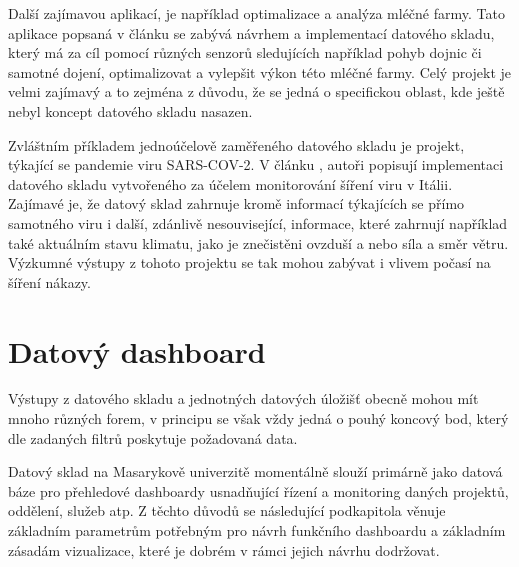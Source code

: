 \documentclass[
  digital,     %
  twoside,     %
  lof,         %
  lot,         %
]{fithesis4}
\begin{document}
Další zajímavou aplikací, je například optimalizace a analýza mléčné farmy. Tato aplikace popsaná v článku  \parencite{Schuetz20180326} se zabývá návrhem a implementací datového skladu, který má za cíl pomocí různých senzorů sledujících například pohyb dojnic či samotné dojení, optimalizovat a vylepšit výkon této mléčné farmy. Celý projekt je velmi zajímavý a to zejména z důvodu, že se jedná o specifickou oblast, kde ještě nebyl koncept datového skladu nasazen.

Zvláštním příkladem jednoúčelově zaměřeného datového skladu je projekt, týkající se pandemie viru SARS-COV-2. V článku  \parencite{Agapito2020}, autoři popisují implementaci datového skladu vytvořeného za účelem monitorování šíření viru v Itálii. Zajímavé je, že datový sklad zahrnuje kromě informací týkajících se přímo samotného viru i další, zdánlivě nesouvisející, informace, které zahrnují například také aktuálním stavu klimatu, jako je znečistěni ovzduší a nebo síla a směr větru. Výzkumné výstupy z tohoto projektu se tak mohou zabývat i vlivem počasí na šíření nákazy. 

\section{Datový dashboard}
Výstupy z datového skladu a jednotných datových úložišť obecně mohou mít mnoho různých forem, v principu se však vždy jedná o pouhý koncový bod, který dle zadaných filtrů poskytuje požadovaná data.

Datový sklad na Masarykově univerzitě momentálně slouží primárně jako datová báze pro přehledové dashboardy usnadňující řízení a monitoring daných projektů, oddělení, služeb atp. Z těchto důvodů se následující podkapitola věnuje základním parametrům potřebným pro návrh funkčního dashboardu a základním zásadám vizualizace, které je dobrém v rámci jejich návrhu dodržovat.
\end{document}

